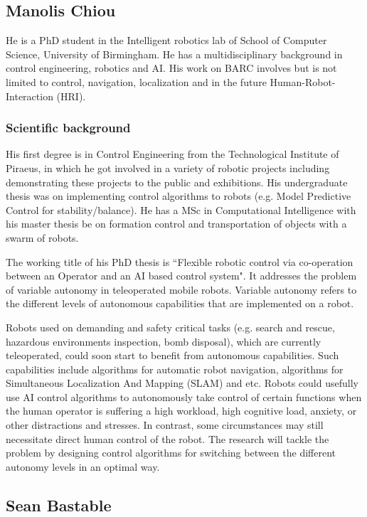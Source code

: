 \documentclass[conference]{IEEEtran}
\begin{document}
\subsection{Manolis Chiou}

He is a PhD student in the Intelligent robotics lab of School of Computer Science, University of Birmingham. He has a multidisciplinary background in control engineering, robotics and AI. His work on BARC involves but is not limited to control, navigation, localization and in the future Human-Robot-Interaction (HRI).

\subsubsection*{Scientific background}

His first degree is in Control Engineering from the Technological Institute of Piraeus, in which he got involved in a variety of robotic projects including demonstrating these projects to the public and exhibitions. His undergraduate thesis was on implementing control algorithms to robots (e.g. Model Predictive Control for stability/balance). He has a MSc in Computational Intelligence with his master thesis be on formation control and transportation of objects with a swarm of robots.  

The working title of his PhD thesis is ``Flexible robotic control via co-operation between an Operator and an AI based control system". It addresses the problem of variable autonomy in teleoperated mobile robots. Variable autonomy refers to the different levels of autonomous capabilities that are implemented on a robot.

Robots used on demanding and safety critical tasks (e.g. search and rescue, hazardous environments inspection, bomb disposal), which are currently teleoperated, could soon start to benefit from autonomous capabilities. Such capabilities include algorithms for automatic robot navigation, algorithms for Simultaneous Localization And Mapping (SLAM) and etc. Robots could usefully use AI control algorithms to autonomously take control of certain functions when the human operator is suffering a high workload, high cognitive load, anxiety, or other distractions and stresses. In contrast, some circumstances may still necessitate direct human control of the robot. The research will tackle the problem by designing control algorithms for switching between the different autonomy levels in an optimal way. 


\subsection{Sean Bastable}
\end{document}
